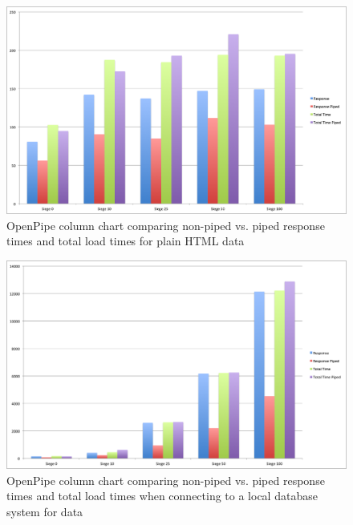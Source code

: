 \documentclass[12pt]{report}
\begin{document}
\begin{figure}[H]
\label{fig:analysisChartPlain}
\centering
\includegraphics[width=\textwidth,keepaspectratio]{figures/images/analysis_chart_plain.png}
\caption{OpenPipe column chart comparing non-piped vs. piped response times and total load times for plain HTML data}
\end{figure}

\begin{figure}[H]
\label{fig:analysisChartDatabase}
\centering
\includegraphics[width=\textwidth,keepaspectratio]{figures/images/analysis_chart_database.png}
\caption{OpenPipe column chart comparing non-piped vs. piped response times and total load times when connecting to a local database system for data}
\end{figure}
\end{document}
